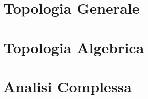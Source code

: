 \documentclass[a4paper, twoside]{book}
\begin{document}
\part{Topologia Generale}
 







\part{Topologia Algebrica}






\part{Analisi Complessa}



















%

%
%
\end{document}
